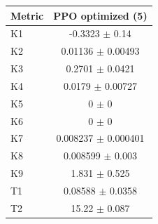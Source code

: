 \begin{tabular}{lc}
\toprule
Metric & PPO optimized (5) \\
\midrule
K1 & -0.3323 $\pm$ 0.14 \\
K2 & 0.01136 $\pm$ 0.00493 \\
K3 & 0.2701 $\pm$ 0.0421 \\
K4 & 0.0179 $\pm$ 0.00727 \\
K5 & 0 $\pm$ 0 \\
K6 & 0 $\pm$ 0 \\
K7 & 0.008237 $\pm$ 0.000401 \\
K8 & 0.008599 $\pm$ 0.003 \\
K9 & 1.831 $\pm$ 0.525 \\
T1 & 0.08588 $\pm$ 0.0358 \\
T2 & 15.22 $\pm$ 0.087 \\
\bottomrule
\end{tabular}
